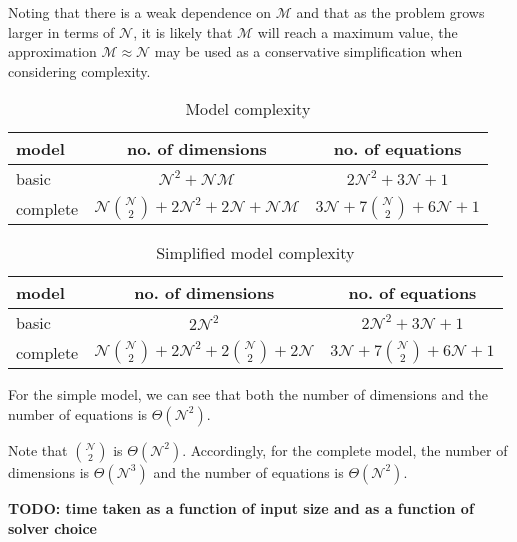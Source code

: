 Noting that there is a weak dependence on $\mathcal{M}$ and that as the problem
grows larger in terms of $\mathcal{N}$, it is likely that $\mathcal{M}$ will
reach a maximum value, the approximation $\mathcal{M} \approx \mathcal{N}$ may
be used as a conservative simplification when considering complexity.
\begin{table}[h!]
    \centering
    \caption{Model complexity}
    \label{tbl.complexity1}
    \begin{tabular}{l | c | c}
        model & no. of dimensions & no. of equations\\ \hline
        basic & $\mathcal{N}^2 + \mathcal{N} \mathcal{M}$
            & $2\mathcal{N}^2 + 3\mathcal{N} + 1$\\
        complete & $\mathcal{N} {{\mathcal{N}}\choose{2}}
            + 2\mathcal{N}^2 + 2\mathcal{N} +\mathcal{N} \mathcal{M}$
            & $3\mathcal{N} + 7{{\mathcal{N}}\choose{2}} + 6\mathcal{N} + 1$\\
    \end{tabular}
\end{table}
\begin{table}[h!]
    \centering
    \caption{Simplified model complexity}
    \label{tbl.complexity2}
    \begin{tabular}{l | c | c}
        model & no. of dimensions & no. of equations\\ \hline
        basic & $2\mathcal{N}^2$ & $2\mathcal{N}^2 + 3\mathcal{N} + 1$\\
        complete & $\mathcal{N} {{\mathcal{N}}\choose{2}}
            + 2\mathcal{N}^2 + 2{{\mathcal{N}}\choose{2}} + 2\mathcal{N}$
            & $3\mathcal{N} + 7{{\mathcal{N}}\choose{2}} + 6\mathcal{N} + 1$\\
    \end{tabular}
\end{table}
For the simple model, we can see that both the number of dimensions and the
number of equations is $\Theta \left( \mathcal{N}^2 \right)$.

Note that ${{\mathcal{N}}\choose{2}}$ is $\Theta \left( \mathcal{N}^2 \right)$.
Accordingly, for the complete model, the number of dimensions is 
$\Theta \left( \mathcal{N}^3 \right)$ and the number of equations is
$\Theta \left( \mathcal{N}^2 \right)$.

\textbf{TODO: time taken as a function of input size and as a function of 
    solver choice}
